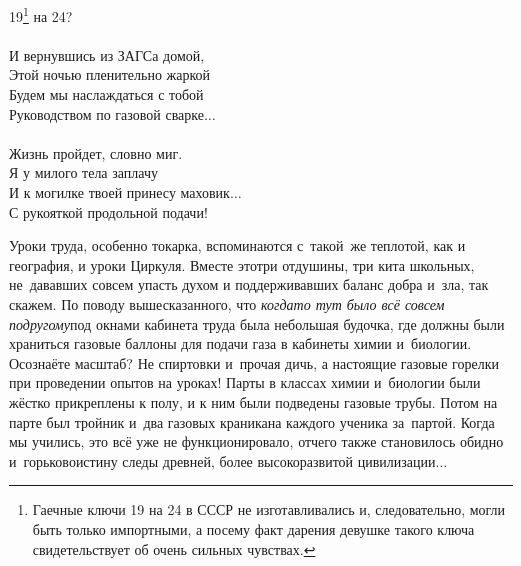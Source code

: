 {\hspace*{2.7cm}19\footnote{Гаечные ключи 19 на 24 в СССР не изготавливались и, следовательно, могли быть только импортными, а посему факт дарения девушке такого ключа свидетельствует об очень сильных чувствах.} на 24?\\
\\
\hspace*{2.7cm}И вернувшись из ЗАГСа домой,\\
\hspace*{2.7cm}Этой ночью пленительно жаркой\\
\hspace*{2.7cm}Будем мы наслаждаться с тобой\\
\hspace*{2.7cm}Руководством по газовой сварке$\ldots$\\
\\
\hspace*{2.7cm}Жизнь пройдет, словно миг.\\
\hspace*{2.7cm}Я у милого тела заплачу\\
\hspace*{2.7cm}И к могилке твоей принесу маховик$\ldots$\\
\hspace*{2.7cm}С рукояткой продольной подачи!\\ 
}
\vspace{0.5cm}

Уроки труда, особенно токарка, вспоминаются с~такой~же теплотой, как и география, и уроки Циркуля. Вместе это\mdash три отдушины, три кита школьных, не~дававших совсем упасть духом и поддерживавших баланс добра и~зла, так скажем. По поводу вышесказанного, что \textit{когда\sdash то тут было всё совсем по\sdash другому}\mdash под окнами кабинета труда была небольшая будочка, где должны были храниться газовые баллоны для подачи газа в кабинеты химии и~биологии. Осознаёте масштаб? Не спиртовки и~прочая дичь, а настоящие газовые горелки при проведении опытов на уроках! Парты в классах химии и~биологии были жёстко прикреплены к полу, и к ним были подведены газовые трубы. Потом на парте был тройник и~два газовых краника\mdash на каждого ученика за~партой. Когда мы учились, это всё уже не функционировало, отчего также становилось обидно и~горько\mdash воистину следы древней, более высокоразвитой цивилизации$\ldots$



\begin{center}
\end{center}